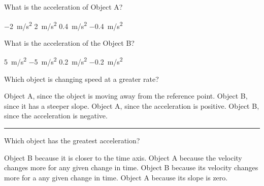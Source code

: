 \documentclass[answers]{exam}
\begin{document}
\begin{questions}
\question \label{c1CMp}
What is the acceleration of Object A?

\begin{randomizechoices}
    \choice \SI{-2}{m/s^2}
    \correctchoice \SI{2}{m/s^2}
    \choice \SI{0.4}{m/s^2}
    \choice \SI{-0.4}{m/s^2}
\end{randomizechoices}

\question 
What is the acceleration of the Object B?

\begin{randomizechoices}
    \choice \SI{5}{m/s^2}
    \correctchoice \SI{-5}{m/s^2}
    \choice \SI{0.2}{m/s^2}
    \choice \SI{-0.2}{m/s^2}
\end{randomizechoices}

\question \label{uwahd}
Which object is changing speed at a greater rate?

\begin{randomizechoices}
    \choice Object A, since the object is moving away from the reference point.
    \correctchoice Object B, since it has a steeper slope.
    \choice Object A, since the acceleration is positive.
    \choice Object B, since the acceleration is negative.
\end{randomizechoices}

\bigskip
\hrule

\question
Which object has the greatest acceleration?

\begin{center}
\end{center}

\begin{randomizechoices}
    \choice Object B because it is closer to the time axis.
    \correctchoice Object A because the velocity changes more for any given change in time.
    \choice Object B because its velocity changes more for a any given change in time.
    \choice Object A because its slope is zero.
\end{randomizechoices}


\end{questions}
\end{document}
